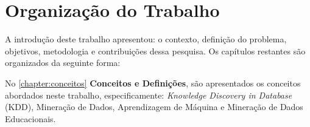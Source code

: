 





\section{Organização do Trabalho}
A introdução deste trabalho apresentou: o contexto, definição do problema, objetivos, metodologia e contribuições dessa pesquisa. Os capítulos restantes são organizados da seguinte forma:

\par
No \autoref{chapter:conceitos} \textbf{Conceitos e Definições}, são apresentados os conceitos abordados neste trabalho, especificamente: \textit{Knowledge Discovery in Database} (KDD), Mineração de Dados, Aprendizagem de Máquina e Mineração de Dados Educacionais.

